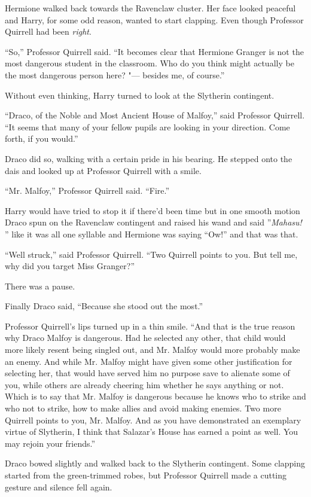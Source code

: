 Hermione walked back towards the Ravenclaw cluster. Her face looked
peaceful and Harry, for some odd reason, wanted to start clapping. Even
though Professor Quirrell had been \emph{right}.

``So,'' Professor Quirrell said. ``It becomes clear that Hermione
Granger is not the most dangerous student in the classroom. Who do you
think might actually be the most dangerous person here? "--- besides me, of
course.''

Without even thinking, Harry turned to look at the Slytherin contingent.

``Draco, of the Noble and Most Ancient House of Malfoy,'' said Professor
Quirrell. ``It seems that many of your fellow pupils are looking in your
direction. Come forth, if you would.''

Draco did so, walking with a certain pride in his bearing. He stepped
onto the dais and looked up at Professor Quirrell with a smile.

``Mr. Malfoy,'' Professor Quirrell said. ``Fire.''

Harry would have tried to stop it if there'd been time but in one smooth
motion Draco spun on the Ravenclaw contingent and raised his wand and
said ''\emph{Mahasu!} '' like it was all one syllable and Hermione was
saying ``Ow!'' and that was that.

``Well struck,'' said Professor Quirrell. ``Two Quirrell points to you.
But tell me, why did you target Miss Granger?''

There was a pause.

Finally Draco said, ``Because she stood out the most.''

Professor Quirrell's lips turned up in a thin smile. ``And that is the
true reason why Draco Malfoy is dangerous. Had he selected any other,
that child would more likely resent being singled out, and Mr. Malfoy
would more probably make an enemy. And while Mr. Malfoy might have given
some other justification for selecting her, that would have served him
no purpose save to alienate some of you, while others are already
cheering him whether he says anything or not. Which is to say that Mr.
Malfoy is dangerous because he knows who to strike and who not to
strike, how to make allies and avoid making enemies. Two more Quirrell
points to you, Mr. Malfoy. And as you have demonstrated an exemplary
virtue of Slytherin, I think that Salazar's House has earned a point as
well. You may rejoin your friends.''

Draco bowed slightly and walked back to the Slytherin contingent. Some
clapping started from the green-trimmed robes, but Professor Quirrell
made a cutting gesture and silence fell again.


